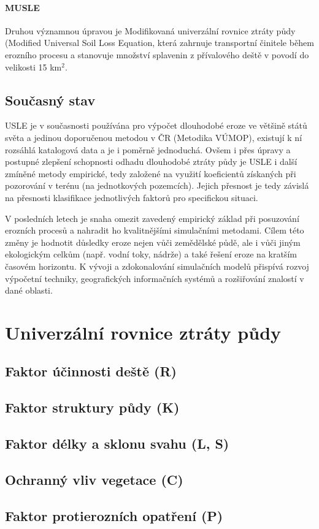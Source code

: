 \paragraph{MUSLE}
Druhou významnou úpravou je Modifikovaná univerzální rovnice ztráty půdy (Modified Universal Soil Loss Equation, která zahrnuje transportní činitele během erozního procesu a stanovuje množství splavenin z přívalového deště v povodí do velikosti 15 km$^{2}$.

\subsection{Současný stav}
USLE je v současnosti používána pro výpočet dlouhodobé eroze ve většině států světa a jedinou doporučenou metodou v ČR (Metodika VÚMOP), existují k ní rozsáhlá katalogová data a je i poměrně jednoduchá. Ovšem i přes úpravy a postupné zlepšení schopnosti odhadu dlouhodobé ztráty půdy je USLE i další zmíněné metody empirické, tedy založené na využití koeficientů získaných při pozorování v terénu (na jednotkových pozemcích). Jejich přesnost je tedy závislá na přesnosti klasifikace jednotlivých faktorů pro specifickou situaci. 

V posledních letech je snaha omezit zavedený empirický základ při posuzování erozních procesů a nahradit ho kvalitnějšími simulačními metodami. Cílem této změny je hodnotit důsledky eroze nejen vůči zemědělské půdě, ale i vůči jiným ekologickým celkům (např. vodní toky, nádrže) a také řešení eroze na kratším časovém horizontu.  K vývoji a zdokonalování simulačních modelů přispívá rozvoj výpočetní techniky, geografických informačních systémů a rozšiřování znalostí v dané oblasti.

\section{Univerzální rovnice ztráty půdy}
\subsection{Faktor účinnosti deště (R)}
\subsection{Faktor struktury půdy (K)}
\subsection{Faktor délky a sklonu svahu (L, S)}
\subsection{Ochranný vliv vegetace (C)}
\subsection{Faktor protierozních opatření (P)}

